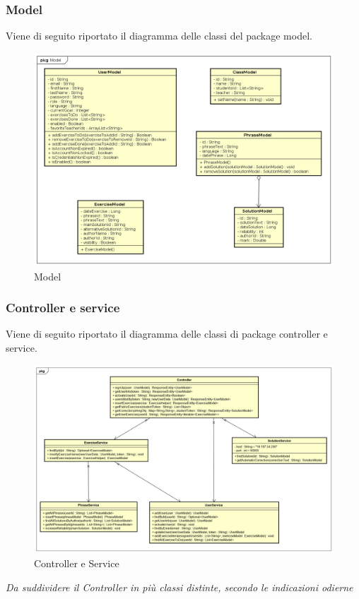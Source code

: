 \newpage
\subsubsection{Model}
Viene di seguito riportato il diagramma delle classi del package model.
\begin{figure}[H]
\centering
\includegraphics[width=17cm, keepaspectratio]{img/model.png} 
\caption{Model}
\end{figure}
\newpage

\subsubsection{Controller e service}
Viene di seguito riportato il diagramma delle classi di package controller e service.
\begin{figure}[H]
\centering
\includegraphics[width=17cm, keepaspectratio]{img/Controller-service.png} 
\caption{Controller e Service}
\end{figure}
\textit{Da suddividere il Controller in più classi distinte, secondo le indicazioni odierne}

